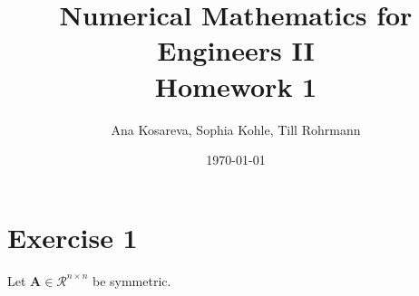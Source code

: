 \documentclass{article}
\title{Numerical Mathematics for Engineers II\\Homework 1}
\author{Ana Kosareva, Sophia Kohle, Till Rohrmann}
\date{\today}
\begin{document}
\maketitle

\section*{Exercise 1}
Let $\pmb A \in \mathcal{R}^{n\times n}$ be symmetric. 
\end{document}
